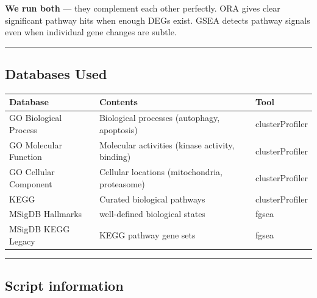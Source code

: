 \documentclass[
]{article}
\begin{document}
\textbf{We run both} --- they complement each other perfectly. ORA gives
clear significant pathway hits when enough DEGs exist. GSEA detects
pathway signals even when individual gene changes are subtle.

\begin{center}\rule{0.5\linewidth}{0.5pt}\end{center}

\subsection{Databases Used}\label{databases-used}

\begin{longtable}[]{@{}
  >{\raggedright\arraybackslash}p{}
  >{\raggedright\arraybackslash}p{}
  >{\raggedright\arraybackslash}p{}@{}}
\toprule\noalign{}
\begin{minipage}[b]{\linewidth}\raggedright
Database
\end{minipage} & \begin{minipage}[b]{\linewidth}\raggedright
Contents
\end{minipage} & \begin{minipage}[b]{\linewidth}\raggedright
Tool
\end{minipage} \\
\midrule\noalign{}
\endhead
\bottomrule\noalign{}
\endlastfoot
GO Biological Process & Biological processes (autophagy, apoptosis) &
clusterProfiler \\
GO Molecular Function & Molecular activities (kinase activity, binding)
& clusterProfiler \\
GO Cellular Component & Cellular locations (mitochondria, proteasome) &
clusterProfiler \\
KEGG & Curated biological pathways & clusterProfiler \\
MSigDB Hallmarks & 50 well-defined biological states & fgsea \\
MSigDB KEGG Legacy & 186 KEGG pathway gene sets & fgsea \\
\end{longtable}

\begin{center}\rule{0.5\linewidth}{0.5pt}\end{center}

\subsection{Script information}\label{script-information}
\end{document}
